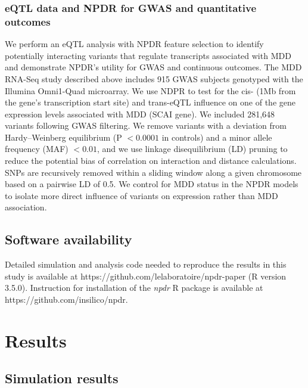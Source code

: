 \documentclass[10pt]{article}
\begin{document}
\subsubsection{eQTL data and NPDR for GWAS and quantitative outcomes}
We perform an eQTL analysis with NPDR feature selection to identify potentially interacting variants that regulate transcripts associated with MDD and demonstrate NPDR's utility for GWAS and continuous outcomes.
The MDD RNA-Seq study described above includes 915 GWAS subjects genotyped with the Illumina Omni1-Quad microarray\cite{mostafavi14}.
We use NDPR to test for the cis- (1Mb from the gene's transcription start site) and trans-eQTL influence on one of the gene expression levels associated with MDD (SCAI gene).
We included 281,648 variants following GWAS filtering.
We remove variants with a deviation from Hardy–Weinberg equilibrium (P $<0.0001$ in controls) and a minor allele frequency (MAF) $<0.01$, and we use linkage disequilibrium (LD) pruning to reduce the potential bias of correlation on interaction and distance calculations.
SNPs are recursively removed within a sliding window along a given chromosome based on a pairwise LD of 0.5.
We control for MDD status in the NPDR models to isolate more direct influence of variants on expression rather than MDD association.


\subsection{Software availability}
Detailed simulation and analysis code needed to reproduce the results in this study is available at {{https://github.com/lelaboratoire/npdr-paper}} (R version 3.5.0).
Instruction for installation of the \emph{npdr} R package is available at {{https://github.com/insilico/npdr}}.


\section{Results}
\subsection{Simulation results} 
\end{document}
